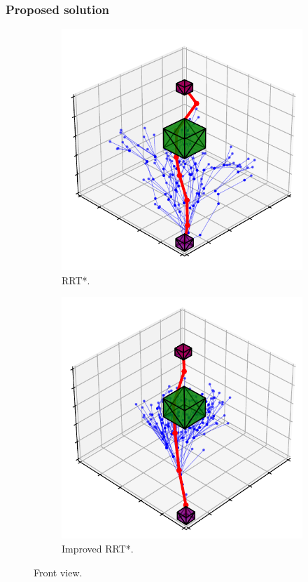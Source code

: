 \documentclass{beamer}
\begin{document}
\begin{frame}
	\frametitle{Proposed solution}	
	\begin{figure}[!ht]
		\centering 
		\begin{subfigure}[b]{0.45\textwidth}
			\includegraphics[width=\textwidth]{figChap4/6D_RRTstar173it_loc_m135to35.pdf}
			\caption{RRT*.} 
		\end{subfigure}  
		\begin{subfigure}[b]{0.45\textwidth}
			\includegraphics[width=\textwidth]{figChap4/6D_RRTstarML193it_loc_m135to35.pdf}
			\caption{Improved RRT*.} 
		\end{subfigure}
		\caption{Front view.}
		 
	  \end{figure}
\end{frame}	
\end{document}

